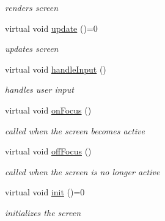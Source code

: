 \begin{DoxyCompactItemize}
\begin{DoxyCompactList}\small\item\em renders screen \end{DoxyCompactList}\item 
\mbox{\label{classnta_1_1Screen_a6892f9b74b033d8bd5f4e9f190d49efa}} 
virtual void \hyperlink{classnta_1_1Screen_a6892f9b74b033d8bd5f4e9f190d49efa}{update} ()=0
\begin{DoxyCompactList}\small\item\em updates screen \end{DoxyCompactList}\item 
\mbox{\label{classnta_1_1Screen_a645ccabe314f6c9084b493617c3eeafe}} 
virtual void \hyperlink{classnta_1_1Screen_a645ccabe314f6c9084b493617c3eeafe}{handle\+Input} ()
\begin{DoxyCompactList}\small\item\em handles user input \end{DoxyCompactList}\item 
\mbox{\label{classnta_1_1Screen_af29956d6f8ac437ef2f26c9d0973e509}} 
virtual void \hyperlink{classnta_1_1Screen_af29956d6f8ac437ef2f26c9d0973e509}{on\+Focus} ()
\begin{DoxyCompactList}\small\item\em called when the screen becomes active \end{DoxyCompactList}\item 
\mbox{\label{classnta_1_1Screen_a172d24c2224aef718d151b621379def1}} 
virtual void \hyperlink{classnta_1_1Screen_a172d24c2224aef718d151b621379def1}{off\+Focus} ()
\begin{DoxyCompactList}\small\item\em called when the screen is no longer active \end{DoxyCompactList}\item 
\mbox{\label{classnta_1_1Screen_ae749bdd554cea6beb81ed8bcd1cd4ed1}} 
virtual void \hyperlink{classnta_1_1Screen_ae749bdd554cea6beb81ed8bcd1cd4ed1}{init} ()=0
\begin{DoxyCompactList}\small\item\em initializes the screen \end{DoxyCompactList}\end{DoxyCompactItemize}
